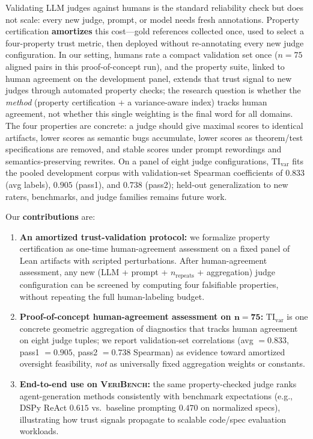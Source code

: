 \documentclass{article}
\begin{document}
Validating LLM judges against humans is the standard reliability check but does not scale: every new judge, prompt, or model needs fresh annotations.
Property certification \textbf{amortizes} this cost---gold references collected once, used to select a four-property trust metric, then deployed without re-annotating every new judge configuration.
In our setting, humans rate a compact validation set once (\(n {=} 75\) aligned pairs in this proof-of-concept run), and the property suite, linked to human agreement on the development panel, extends that trust signal to new judges through automated property checks; the research question is whether the \emph{method} (property certification + a variance-aware index) tracks human agreement, not whether this single weighting is the final word for all domains.
The four properties are concrete: a judge should give maximal scores to identical artifacts, lower scores as semantic bugs accumulate, lower scores as theorem/test specifications are removed, and stable scores under prompt rewordings and semantics-preserving rewrites.
On a panel of eight judge configurations, \(\mathrm{TI}_{\mathrm{var}}\) fits the pooled development corpus with validation-set Spearman coefficients of \(0.833\) (avg labels), \(0.905\) (pass1), and \(0.738\) (pass2); held-out generalization to new raters, benchmarks, and judge families remains future work.

Our \textbf{contributions} are:
\begin{enumerate}
  \item \textbf{An amortized trust-validation protocol:} we formalize property certification as one-time human-agreement assessment on a fixed panel of Lean artifacts with scripted perturbations. After human-agreement assessment, any new (LLM + prompt + \(n_\text{repeats}\) + aggregation) judge configuration can be screened by computing four falsifiable properties, without repeating the full human-labeling budget.

  \item \textbf{Proof-of-concept human-agreement assessment on \(\bm{n{=}75}\):} \(\mathrm{TI}_{\mathrm{var}}\) is one concrete geometric aggregation of diagnostics that tracks human agreement on eight judge tuples; we report validation-set correlations (avg \(=0.833\), pass1 \(=0.905\), pass2 \(=0.738\) Spearman) as evidence toward amortized oversight feasibility, \emph{not} as universally fixed aggregation weights or constants.
  \item \textbf{End-to-end use on \textsc{VeriBench}:} the same property-checked judge ranks agent-generation methods consistently with benchmark expectations (e.g., DSPy ReAct \(0.615\) vs.\ baseline prompting \(0.470\) on normalized specs), illustrating how trust signals propagate to scalable code/spec evaluation workloads.
\end{enumerate}
\end{document}
